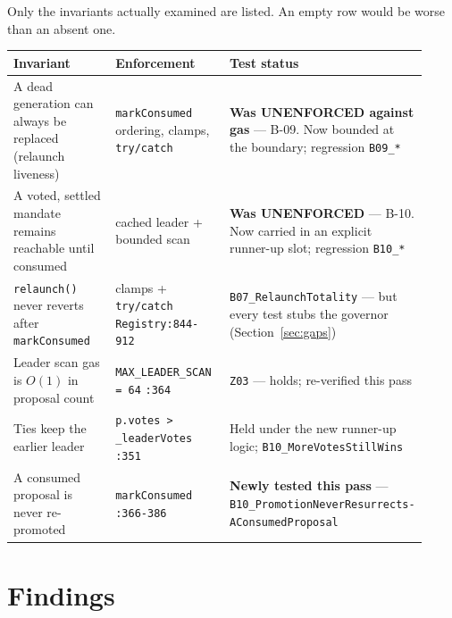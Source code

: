 \documentclass[11pt,a4paper]{article}
\newcommand{\code}[1]{\texttt{\small #1}}
\newcommand{\fileref}[1]{\texttt{\scriptsize #1}}
\begin{document}
Only the invariants actually examined are listed. An empty row would be worse than an
absent one.

\begin{longtable}{@{}p{0.30\linewidth}p{0.30\linewidth}p{0.32\linewidth}@{}}
\toprule
\textbf{Invariant} & \textbf{Enforcement} & \textbf{Test status} \\
\midrule
\endhead
A dead generation can always be replaced (relaunch liveness) &
  \code{markConsumed} ordering, clamps, \code{try/catch} &
  \textcolor{critical}{\textbf{Was UNENFORCED against gas}} --- B-09. Now bounded at the
  boundary; regression \code{B09\_*} \\
A voted, settled mandate remains reachable until consumed &
  cached leader + bounded scan &
  \textcolor{critical}{\textbf{Was UNENFORCED}} --- B-10. Now carried in an explicit
  runner-up slot; regression \code{B10\_*} \\
\code{relaunch()} never reverts after \code{markConsumed} &
  clamps + \code{try/catch} \fileref{Registry:844-912} &
  \code{B07\_RelaunchTotality} --- but every test stubs the governor
  (Section~\ref{sec:gaps}) \\
Leader scan gas is $O(1)$ in proposal count &
  \code{MAX\_LEADER\_SCAN = 64} \fileref{:364} &
  \code{Z03} --- holds; re-verified this pass \\
Ties keep the earlier leader &
  \code{p.votes > \_leaderVotes} \fileref{:351} &
  Held under the new runner-up logic; \code{B10\_MoreVotesStillWins} \\
A consumed proposal is never re-promoted &
  \code{markConsumed} \fileref{:366-386} &
  \textbf{Newly tested this pass} ---
  \fileref{B10\_PromotionNeverResurrects-} \fileref{AConsumedProposal} \\
\bottomrule
\end{longtable}

\section{Findings}
\end{document}
